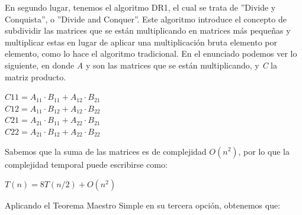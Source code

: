 \documentclass[12pt]{report}
\begin{document}
  \begin{center}
  \end{center}
    
  En segundo lugar, tenemos el algoritmo DR1, el cual se trata de ''Divide y Conquista'', o ''Divide and Conquer''. Este algoritmo introduce el concepto de subdividir las matrices que se están multiplicando en matrices más pequeñas y multiplicar estas en lugar de aplicar una multiplicación bruta elemento por elemento, como lo hace el algoritmo tradicional. En el enunciado podemos ver lo siguiente, en donde \textit{A} y  son las matrices que se están multiplicando, y \textit{C} la matriz producto.

  \begin{center}
    $ C11 = A_{11} \cdot B_{11} + A_{12} \cdot B_{21} $\\
    $ C12 = A_{11} \cdot B_{12} + A_{12} \cdot B_{22}$\\
    $ C21 = A_{21} \cdot B_{11} + A_{22} \cdot B_{21} $\\
    $ C22 = A_{21} \cdot B_{12} + A_{22} \cdot B_{22} $\\
  \end{center}

  Sabemos que la suma de las matrices es de complejidad $O(n^2)$, por lo que la complejidad temporal puede escribirse como:

  \begin{center}
    $ T(n) = 8T(n/2) + O(n^2) $
  \end{center}

  Aplicando el Teorema Maestro Simple en su tercera opción, obtenemos que:
\end{document}
